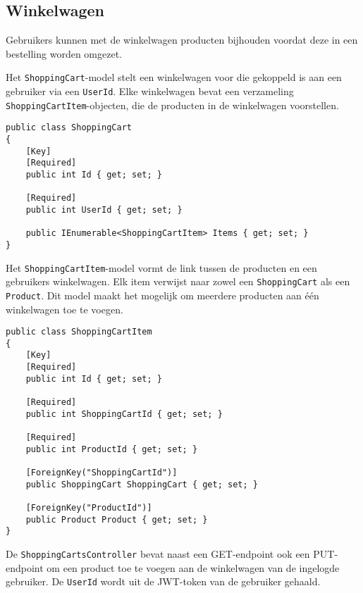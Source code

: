 \subsection{Winkelwagen}

Gebruikers kunnen met de winkelwagen producten bijhouden voordat deze in een bestelling worden omgezet.

\medskip
Het \texttt{ShoppingCart}-model stelt een winkelwagen voor die gekoppeld is aan een gebruiker via een \texttt{UserId}. Elke winkelwagen bevat een verzameling \texttt{ShoppingCartItem}-objecten, die de producten in de winkelwagen voorstellen.
\medskip

\begin{lstlisting}[style=mystyleA, caption=ShoppingCart.cs, label=lst:MonoShoppingCartModel]
public class ShoppingCart
{
	[Key]
	[Required]
	public int Id { get; set; }
	
	[Required]
	public int UserId { get; set; }
	
	public IEnumerable<ShoppingCartItem> Items { get; set; }
}
\end{lstlisting}

\medskip
Het \texttt{ShoppingCartItem}-model vormt de link tussen de producten en een gebruikers winkelwagen. Elk item verwijst naar zowel een \texttt{ShoppingCart} als een \texttt{Product}. Dit model maakt het mogelijk om meerdere producten aan één winkelwagen toe te voegen.
\medskip

\begin{lstlisting}[style=mystyleA, caption=ShoppingCartItem.cs, label=lst:MonoShoppingCartItemModel]
public class ShoppingCartItem
{
	[Key]
	[Required]
	public int Id { get; set; }
	
	[Required]
	public int ShoppingCartId { get; set; }
	
	[Required]
	public int ProductId { get; set; }
	
	[ForeignKey("ShoppingCartId")]
	public ShoppingCart ShoppingCart { get; set; }
	
	[ForeignKey("ProductId")]
	public Product Product { get; set; }
}
\end{lstlisting}

\medskip
De \texttt{ShoppingCartsController} bevat naast een GET-endpoint ook een PUT-endpoint om een product toe te voegen aan de winkelwagen van de ingelogde gebruiker. De \texttt{UserId} wordt uit de JWT-token van de gebruiker gehaald.
\medskip

